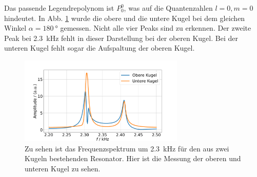 Das passende Legendrepolynom ist $P^0_0$, was auf die Quantenzahlen $l=0, m=0$ hindeutet. In Abb. \ref{fig:phase} wurde die obere und die untere Kugel bei dem gleichen Winkel $\alpha=\SI{180}{\degree}$ gemessen. 
Nicht alle vier Peaks sind zu erkennen. Der zweite Peak bei \SI{2.3}{\kilo\hertz} fehlt in dieser Darstellung bei der oberen Kugel. Bei der unteren Kugel fehlt sogar die Aufspaltung der oberen Kugel.  

\begin{figure}
    \centering
    \includegraphics[width=0.7\textwidth]{plots/D_phase.pdf}
    \caption{Zu sehen ist das Frequenzspektrum um \SI{2.3}{\kilo\hertz} für den aus zwei Kugeln bestehenden Resonator. Hier ist die Messung der oberen und unteren Kugel zu sehen.}
    \label{fig:phase}
\end{figure}